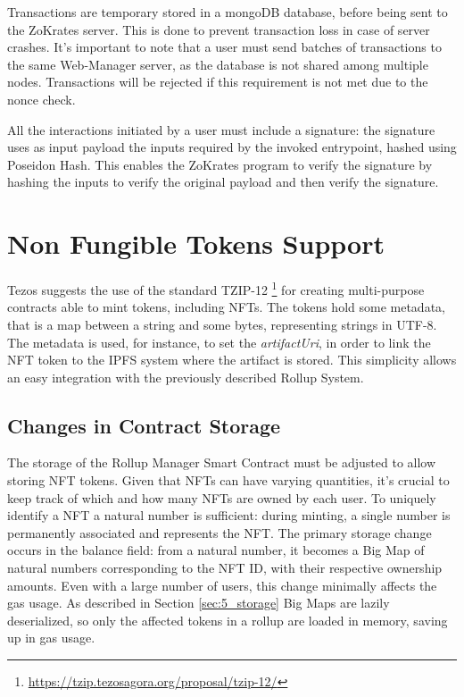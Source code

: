 Transactions are temporary stored in a mongoDB database, before being sent to the ZoKrates server. This is done to prevent transaction loss in case of server crashes. It's important to note that a user must send batches of transactions to the same Web-Manager server, as the database is not shared among multiple nodes. Transactions will be rejected if this requirement is not met due to the nonce check.

All the interactions initiated by a user must include a signature: the signature uses as input payload the inputs required by the invoked entrypoint, hashed using Poseidon Hash. This enables the ZoKrates program to verify the signature by hashing the inputs to verify the original payload and then verify the signature.

\section{Non Fungible Tokens Support}

Tezos suggests the use of the standard TZIP-12 \footnote{\url{https://tzip.tezosagora.org/proposal/tzip-12/}} for creating multi-purpose contracts able to mint tokens, including NFTs. The tokens hold some metadata, that is a map between a string and some bytes, representing strings in UTF-8. The metadata is used, for instance, to set the \textit{artifactUri}, in order to link the NFT token to the IPFS system where the artifact is stored. This simplicity allows an easy integration with the previously described Rollup System.

\subsection{Changes in Contract Storage}

The storage of the Rollup Manager Smart Contract must be adjusted to allow storing NFT tokens. Given that NFTs can have varying quantities, it's crucial to keep track of which and how many NFTs are owned by each user. To uniquely identify a NFT a natural number is sufficient: during minting, a single number is permanently associated and represents the NFT. The primary storage change occurs in the balance field: from a natural number, it becomes a Big Map of natural numbers corresponding to the NFT ID, with their respective ownership amounts. Even with a large number of users, this change minimally affects the gas usage. As described in Section \ref{sec:5_storage} Big Maps are lazily deserialized, so only the affected tokens in a rollup are loaded in memory, saving up in gas usage.

